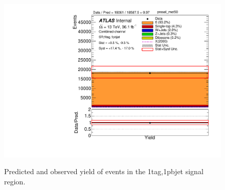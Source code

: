 \begin{figure}[!htbp]
\begin{center}

\includegraphics[scale=0.33]{./figures/boosted/Plot1tag1pbjet/DataMC_1tag_1pbjet_SR_lepton_presel_met50_neventsweighted} \\
\caption{Predicted and observed yield of events in the 1tag,1pbjet signal region.}
\label{fig:boosted_SR_1tag_1pbjet_normplot}
\end{center}
\end{figure}

